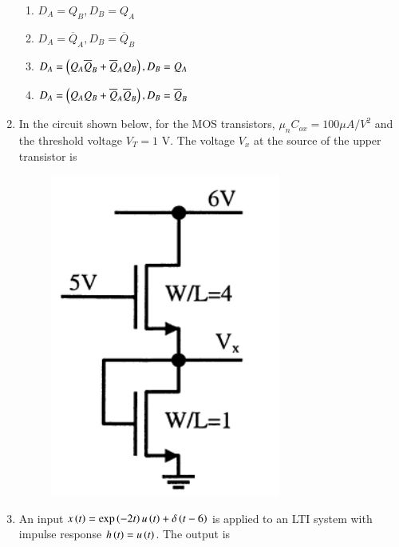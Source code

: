 \documentclass[a4paper, 11pt]{article}
\begin{document}
\begin{enumerate}
    \begin{enumerate}
        \item $D_{A}=Q_{B}, D_{B}=Q_{A}$
        \item $D_{A}=\overline{Q}_{A}, D_{B}=\overline{Q}_{B}$
        \item $D_{A}=\left(Q_{A}\overline{Q}_{B}+\overline{Q}_{A}Q_{B}\right), D_{B}=Q_{A}$
        \item $D_{A}=\left(Q_{A}Q_{B}+\overline{Q}_{A}\overline{Q}_{B}\right), D_{B}=\overline{Q}_{B}$
    \end{enumerate}

    \hfill{}

    \item In the circuit shown below, for the MOS transistors, $\mu_{n}C_{ox}=100 \mu A/V^{2}$ and the threshold voltage $V_{T}=1$ V. The voltage $V_{x}$ at the source of the upper transistor is
    
    \begin{figure}[H]
        \centering
        \includegraphics[width=0.2\columnwidth]{figs/q42.png}
        \caption*{}
        \label{fig:q42}
    \end{figure}
    
    \begin{enumerate}
    \end{enumerate}

    \hfill{}

    \item An input $x\left(t\right)=\exp\left(-2t\right)u\left(t\right)+\delta\left(t-6\right)$ is applied to an LTI system with impulse response $h\left(t\right)=u\left(t\right)$. The output is
    
    \begin{enumerate}
    \end{enumerate}


\end{enumerate}
\end{document}
